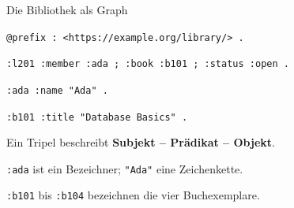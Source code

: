\begin{frame}[t]{Die Bibliothek als Graph}

\small
\texttt{@prefix : <https://example.org/library/> .}\par\medskip
\texttt{:l201 :member :ada ; :book :b101 ; :status :open .}\par\smallskip
\texttt{:ada :name "Ada" .}\par
\texttt{:b101 :title "Database Basics" .}
\vspace{5mm}\par\normalsize
Ein Tripel beschreibt \textbf{Subjekt -- Prädikat -- Objekt}.\par
\smallskip\texttt{:ada} ist ein Bezeichner; \texttt{"Ada"} eine Zeichenkette.\par
\smallskip\texttt{:b101} bis \texttt{:b104} bezeichnen die vier Buchexemplare.

\end{frame}
